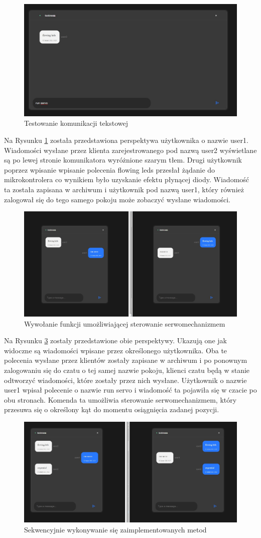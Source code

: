 \begin{figure}[htbp]
	\centering
	\includegraphics[width=0.5\linewidth]{"obrazy/TESTpisaniewiadomosci"}
	\caption{Testowanie komunikacji tekstowej}
	\label{fig:44}
\end{figure}
Na Rysunku \ref{fig:44} została przedstawiona perspektywa użytkownika o nazwie user1. Wiadomości wysłane przez klienta zarejestrowanego pod nazwą user2 wyświetlane są po lewej stronie komunikatora wyróżnione szarym tłem. Drugi użytkownik poprzez wpisanie wpisanie polecenia flowing leds przesłał żądanie do mikrokontrolera co wynikiem było uzyskanie efektu płynącej diody. Wiadomość ta została zapisana w archiwum i użytkownik pod nazwą user1, który również zalogował się do tego samego pokoju może zobaczyć wysłane wiadomości. 
\begin{figure}[htbp]
	\centering
	\includegraphics[width=0.5\linewidth]{"obrazy/TESTwidok2interfejsy"}
	\caption{Wywołanie funkcji umożliwiającej sterowanie serwomechanizmem}
	\label{fig:45}
\end{figure}
\newpage
Na Rysunku \ref{fig:46} zostały przedstawione obie perspektywy. Ukazują one jak widoczne są wiadomości wpisane przez określonego użytkownika. Oba te polecenia wysłane przez klientów zostały zapisane w archiwum i po ponownym zalogowaniu się do czatu o tej samej nazwie pokoju, klienci czatu będą w stanie odtworzyć wiadomości, które zostały przez nich wysłane. Użytkownik o nazwie user1 wpisał polecenie o nazwie run servo i wiadomość ta pojawiła się w czacie po obu stronach. Komenda ta umożliwia sterowanie serwomechanizmem, który przesuwa się o określony kąt do momentu osiągnięcia zadanej pozycji.
\begin{figure}[htbp]
	\centering
	\includegraphics[width=0.5\linewidth]{"obrazy/TESTwidok2interfejsysequential"}
	\caption{Sekwencyjnie wykonywanie się zaimplementowanych metod}
	\label{fig:46}
\end{figure}

